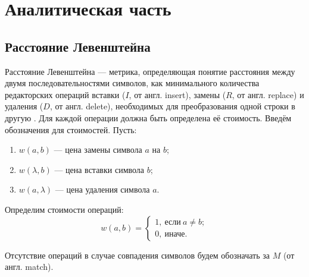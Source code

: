 \section{Аналитическая часть}

\subsection{Расстояние Левенштейна}

Расстояние Левенштейна --- метрика, определяющая понятие расстояния между двумя последовательностями символов, как минимального количества редакторских операций вставки ($I$, от англ. insert), замены ($R$, от англ. replace) и удаления ($D$, от англ. delete), необходимых для преобразования одной строки в другую \cite{lev}.
Для каждой операции должна быть определена её стоимость.
Введём обозначения для стоимостей.
Пусть:
\begin{enumerate}
    \item $w(a, b)$ --- цена замены символа $a$ на $b$;
    \item $w(\lambda, b)$ --- цена вставки символа $b$;
    \item $w(a, \lambda)$ --- цена удаления символа $a$.
\end{enumerate}

Определим стоимости операций:
\begin{equation}
    w(a, b) = \begin{cases}
        1,\ \text{если}\ a \neq b; \\
        0,\ \text{иначе}.
    \end{cases}
    \label{eq:w}
\end{equation}

Отсутствие операций в случае совпадения символов будем обозначать за $M$ (от англ. match).

